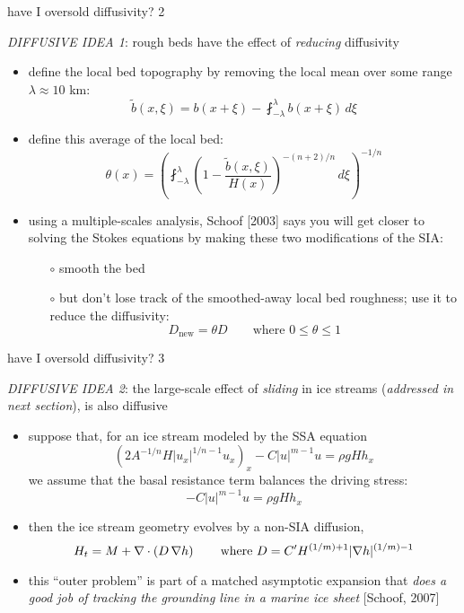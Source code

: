 \begin{frame}{have I oversold diffusivity? 2}

\emph{DIFFUSIVE IDEA 1}: rough beds have the effect of \emph{reducing} diffusivity
\begin{itemize}
\item define the local bed topography by removing the local mean over some range $\lambda \approx 10$ km:
\small
   $$\tilde b(x,\xi) = b(x+\xi) - \fint_{-\lambda}^\lambda b(x+\xi)\,d\xi$$
\normalsize
\item define this average of the local bed:
\small
	$$\theta(x) = \left(\fint_{-\lambda}^\lambda \left(1 - \frac{\tilde b(x,\xi)}{H(x)}
                           \right)^{-(n+2)/n}\,d\xi\right)^{-1/n}$$
\normalsize
\item using a multiple-scales analysis, Schoof [2003] says you will get closer to solving the Stokes equations by making these two modifications of the SIA:
  \begin{itemize}
  \item[$\circ$] smooth the bed
  \item[$\circ$] but don't lose track of the smoothed-away local bed roughness; use it to reduce the diffusivity:
  \small
  		$$D_{\text{new}} = \theta D \qquad \text{where } 0 \le \theta \le 1$$
  \end{itemize}
\end{itemize}
\end{frame}


\begin{frame}{have I oversold diffusivity? 3}

\emph{DIFFUSIVE IDEA 2}: the large-scale effect of \emph{sliding} in ice streams (\emph{addressed in next section}), is also diffusive
\begin{itemize}
\item suppose that, for an ice stream modeled by the SSA equation
   $$\left(2 A^{-1/n} H |u_x|^{1/n - 1} u_x \right)_x - C|u|^{m-1}u = \rho g H h_x$$
we assume that the basal resistance term balances the driving stress:
   $$- C|u|^{m-1}u = \rho g H h_x$$
\item then the ice stream geometry evolves by a non-SIA diffusion,
	$$H_t = M + \nabla\cdot\left(D\,\nabla h\right) \qquad \text{where } D = C' H^{(1/m)+1}|\nabla h|^{(1/m)-1}$$
\item this ``outer problem'' is part of a matched asymptotic expansion that \emph{does a good job of tracking the grounding line in a marine ice sheet} [Schoof, 2007]
\end{itemize}
\end{frame}

